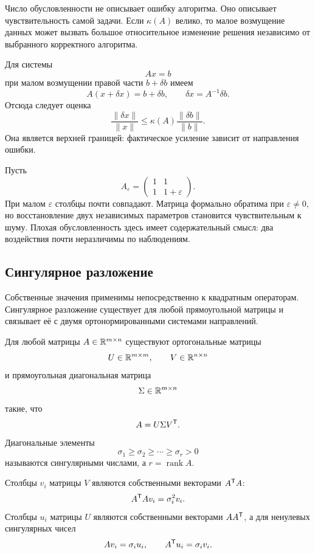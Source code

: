 Число обусловленности не описывает ошибку алгоритма. Оно описывает чувствительность самой задачи. Если \(\kappa(A)\) велико, то малое возмущение данных может вызвать большое относительное изменение решения независимо от выбранного корректного алгоритма.

Для системы
\[
Ax=b
\]
при малом возмущении правой части \(b+\delta b\) имеем
\[
A(x+\delta x)=b+\delta b,
\qquad
\delta x=A^{-1}\delta b.
\]
Отсюда следует оценка
\[
\frac{\|\delta x\|}{\|x\|}
\leq
\kappa(A)
\frac{\|\delta b\|}{\|b\|}.
\]
Она является верхней границей: фактическое усиление зависит от направления ошибки.

\begin{example}
Пусть
\[
A_\varepsilon=
\begin{pmatrix}
1&1\\
1&1+\varepsilon
\end{pmatrix}.
\]
При малом \(\varepsilon\) столбцы почти совпадают. Матрица формально обратима при \(\varepsilon\neq0\), но восстановление двух независимых параметров становится чувствительным к шуму. Плохая обусловленность здесь имеет содержательный смысл: два воздействия почти неразличимы по наблюдениям.
\end{example}

\subsection{Сингулярное разложение}

Собственные значения применимы непосредственно к квадратным операторам. Сингулярное разложение существует для любой прямоугольной матрицы и связывает её с двумя ортонормированными системами направлений.

\begin{theorem}
Для любой матрицы \(A\in\mathbb{R}^{m\times n}\) существуют ортогональные матрицы
\[
U\in\mathbb{R}^{m\times m},
\qquad
V\in\mathbb{R}^{n\times n}
\]
и прямоугольная диагональная матрица
\[
\Sigma\in\mathbb{R}^{m\times n}
\]
такие, что
\[
A=U\Sigma V^{\mathsf{T}}.
\]
Диагональные элементы
\[
\sigma_1\geq\sigma_2\geq\cdots\geq\sigma_r>0
\]
называются сингулярными числами, а \(r=\operatorname{rank}A\).
\end{theorem}

Столбцы \(v_i\) матрицы \(V\) являются собственными векторами \(A^{\mathsf{T}}A\):
\[
A^{\mathsf{T}}Av_i=\sigma_i^2v_i.
\]
Столбцы \(u_i\) матрицы \(U\) являются собственными векторами \(AA^{\mathsf{T}}\), а для ненулевых сингулярных чисел
\[
Av_i=\sigma_i u_i,
\qquad
A^{\mathsf{T}}u_i=\sigma_i v_i.
\]

